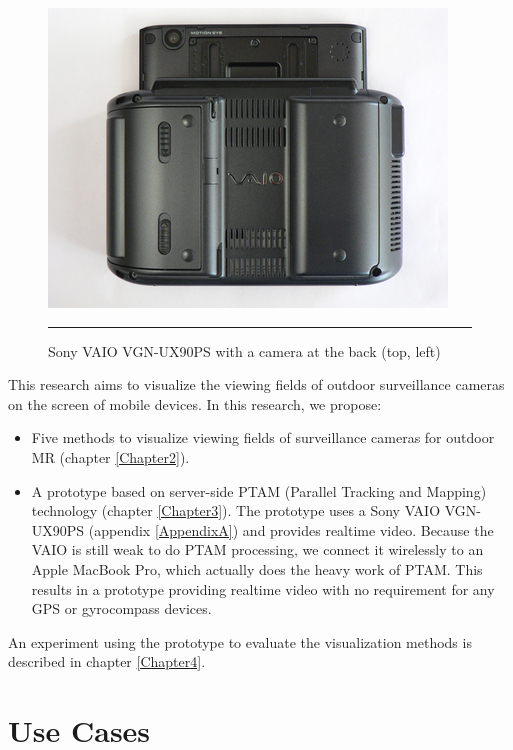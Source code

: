 \begin{figure}[htbp]
	\centering
	\includegraphics{./Primitives/vaio_back.jpg}
	\rule{35em}{0.5pt}
	\caption[Sony VAIO VGN-UX90PS with a camera at the back]{Sony VAIO VGN-UX90PS with a camera at the back (top, left)}
	\label{fig:VAIOBack}
\end{figure}

This research aims to visualize the viewing fields of outdoor surveillance cameras on the screen of mobile devices. In this research, we propose:

\begin{itemize}
	\item Five methods to visualize viewing fields of surveillance cameras for outdoor MR (chapter \ref{Chapter2}).
	\item A prototype based on server-side PTAM (Parallel Tracking and Mapping) \citep{Reference12} technology (chapter \ref{Chapter3}). The prototype uses a Sony VAIO VGN-UX90PS (appendix \ref{AppendixA}) and provides realtime video. Because the VAIO is still weak to do PTAM processing, we connect it wirelessly to an Apple MacBook Pro, which actually does the heavy work of PTAM. This results in a prototype providing realtime video with no requirement for any GPS or gyrocompass devices.
\end{itemize}

An experiment using the prototype to evaluate the visualization methods is described in chapter \ref{Chapter4}.


\section{Use Cases}
\label{UseCases}

